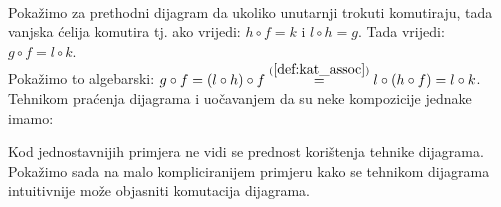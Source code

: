 \begin{example}\ \\

    \noindent Pokažimo za prethodni dijagram da ukoliko unutarnji trokuti
    komutiraju, tada vanjska ćelija komutira tj. ako vrijedi: $h \circ f = k$ i $ l \circ h = g$.
    Tada vrijedi: $g \circ f = l \circ k$.\\
    Pokažimo to algebarski: $g \circ f = (l \circ h) \circ f \overset{(\ref{def:kat_assoc})}{=} l \circ (h \circ f) = l \circ k$.
    Tehnikom praćenja dijagrama i uočavanjem da su neke kompozicije jednake imamo:
    \begin{center}
    \end{center}
\end{example}

  Kod jednostavnijih primjera ne vidi se prednost korištenja tehnike dijagrama.
  Pokažimo sada na malo kompliciranijem primjeru kako se tehnikom dijagrama
  intuitivnije može objasniti komutacija dijagrama.\\

